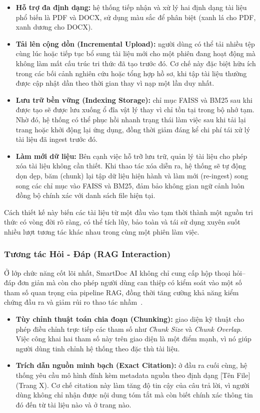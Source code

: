 \documentclass[10pt, conference, a4paper, compsocconf]{IEEEtran}
\newcommand{\smartdoc}{SmartDoc AI}
\begin{document}
\begin{itemize}
  \item \textbf{Hỗ trợ đa định dạng:} hệ thống tiếp nhận và xử lý hai định dạng tài liệu phổ biến là PDF và DOCX, sử dụng màu sắc để phân biệt (xanh lá cho PDF, xanh dương cho DOCX).
  \item \textbf{Tải lên cộng dồn (Incremental Upload):} người dùng có thể tải nhiều tệp cùng lúc hoặc tiếp tục bổ sung tài liệu mới cho một phiên đang hoạt động mà không làm mất cấu trúc tri thức đã tạo trước đó. Cơ chế này đặc biệt hữu ích trong các bối cảnh nghiên cứu hoặc tổng hợp hồ sơ, khi tập tài liệu thường được cập nhật dần theo thời gian thay vì nạp một lần duy nhất.
  \item \textbf{Lưu trữ bền vững (Indexing Storage):} chỉ mục FAISS và BM25 sau khi được tạo sẽ được lưu xuống ổ đĩa vật lý thay vì chỉ tồn tại trong bộ nhớ tạm. Nhờ đó, hệ thống có thể phục hồi nhanh trạng thái làm việc sau khi tải lại trang hoặc khởi động lại ứng dụng, đồng thời giảm đáng kể chi phí tái xử lý tài liệu đã ingest trước đó.
  \item \textbf{Làm mới dữ liệu:} Bên cạnh việc hỗ trỡ lưu trữ, quản lý tài liệu cho phép xóa tài liệu không cần thiết. Khi thao tác xóa diễn ra, hệ thống sẽ tự động dọn dẹp, băm (chunk) lại tập dữ liệu hiện hành và làm mới (re-ingest) song song các chỉ mục vào FAISS và BM25, đảm bảo không gian ngữ cảnh luôn đồng bộ chính xác với danh sách file hiện tại.  
\end{itemize}

\vspace{1 em}
Cách thiết kế này biến các tài liệu từ một đầu vào tạm thời thành một nguồn tri thức có vòng đời rõ ràng, có thể tích lũy, bảo toàn và tái sử dụng xuyên suốt nhiều lượt tương tác khác nhau trong cùng một phiên làm việc.

\vspace{1 em}
\subsubsection{Tương tác Hỏi - Đáp (RAG Interaction)}
Ở lớp chức năng cốt lõi nhất, \smartdoc{} không chỉ cung cấp hộp thoại hỏi--đáp đơn giản mà còn cho phép người dùng can thiệp có kiểm soát vào một số tham số quan trọng của pipeline RAG, đồng thời tăng cường khả năng kiểm chứng đầu ra và giảm rủi ro thao tác nhầm~\cite{smartdoc-source}.

\begin{itemize}
  \item \textbf{Tùy chỉnh thuật toán chia đoạn (Chunking):} giao diện kỹ thuật cho phép điều chỉnh trực tiếp các tham số như \textit{Chunk Size} và \textit{Chunk Overlap}. Việc công khai hai tham số này trên giao diện là một điểm mạnh, vì nó giúp người dùng tinh chỉnh hệ thống theo đặc thù tài liệu.
  \item \textbf{Trích dẫn nguồn minh bạch (Exact Citation):} ở đầu ra cuối cùng, hệ thống yêu cầu mô hình đính kèm metadata nguồn theo định dạng [Tên File] (Trang X). Cơ chế citation này làm tăng độ tin cậy của câu trả lời, vì người dùng không chỉ nhận được nội dung tóm tắt mà còn biết chính xác thông tin đó đến từ tài liệu nào và ở trang nào.
\end{itemize}
\end{document}
